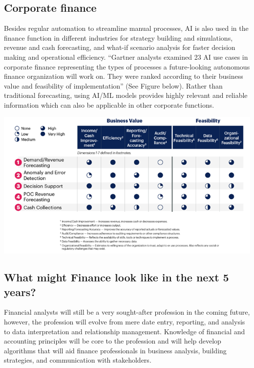 \documentclass[
]{article}
\begin{document}
\hypertarget{corporate-finance}{%
\subsection{Corporate finance}\label{corporate-finance}}

Besides regular automation to streamline manual processes, AI is also used in the finance function in different industries for strategy building and simulations, revenue and cash forecasting, and what-if scenario analysis for faster decision making and operational efficiency. ``Gartner analysts examined 23 AI use cases in corporate finance representing the types of processes a future-looking autonomous finance organization will work on. They were ranked according to their business value and feasibility of implementation'' (See Figure below). Rather than traditional forecasting, using AI/ML models provides highly relevant and reliable information which can also be applicable in other corporate functions.

\includegraphics{financeaiusecases.jpg}

\hypertarget{what-might-finance-look-like-in-the-next-5-years}{%
\subsection{What might Finance look like in the next 5 years?}\label{what-might-finance-look-like-in-the-next-5-years}}

Financial analysts will still be a very sought-after profession in the coming future, however, the profession will evolve from mere date entry, reporting, and analysis to data interpretation and relationship management. Knowledge of financial and accounting principles will be core to the profession and will help develop algorithms that will aid finance professionals in business analysis, building strategies, and communication with stakeholders.
\end{document}
